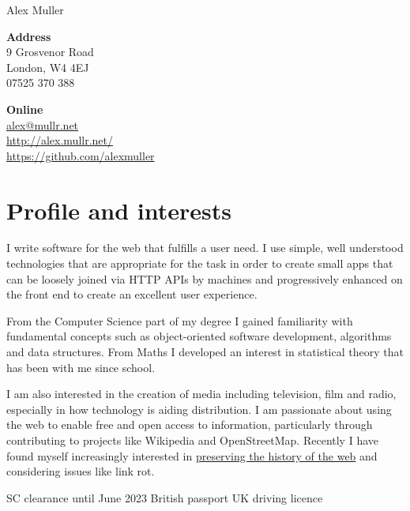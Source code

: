 \documentclass[10pt,a4paper]{article}
\def\name{Alex Muller}
\begin{document}
{\huge \name}

\bigskip

\begin{minipage}[t]{0.26\textwidth}
  \textbf{Address} \\
  9 Grosvenor Road \\
  London, W4 4EJ \\
  07525 370 388 \\
\end{minipage}
\begin{minipage}[t]{0.5\textwidth}
  \textbf{Online} \\
  \href{mailto:alex@mullr.net}{alex@mullr.net} \\
  \href{http://alex.mullr.net/}{http://alex.mullr.net/} \\
  \href{https://github.com/alexmuller}{https://github.com/alexmuller} \\
\end{minipage}

\section*{Profile and interests}

I write software for the web that fulfills a user need. I use simple, well
understood technologies that are appropriate for the task in order to create
small apps that can be loosely joined via HTTP APIs by machines and
progressively enhanced on the front end to create an excellent user experience.

From the Computer Science part of my degree I gained familiarity with
fundamental concepts such as object-oriented software development, algorithms
and data structures. From Maths I developed an interest in statistical theory
that has been with me since school.

I am also interested in the creation of media including television, film and
radio, especially in how technology is aiding distribution. I am passionate
about using the web to enable free and open access to information,
particularly through contributing to projects like Wikipedia and
OpenStreetMap. Recently I have found myself increasingly interested in
\href{http://alex.mullr.net/blog/2011/11/the-web-growing-up/}{preserving the
history of the web} and considering issues like link rot.

SC clearance until June 2023 \textbullet{}
British passport \textbullet{}
UK driving licence

\end{document}
